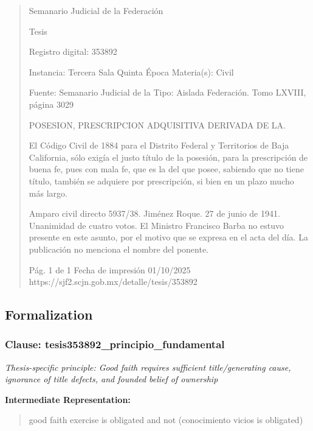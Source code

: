 \documentclass[11pt,a4paper]{article}
\begin{document}
\begin{quote}
                                                   Semanario Judicial de la Federación

                                                  Tesis

 Registro digital: 353892

 Instancia: Tercera Sala          Quinta Época                           Materia(s): Civil

                                  Fuente: Semanario Judicial de la       Tipo: Aislada
                                  Federación.
                                  Tomo LXVIII, página 3029


POSESION, PRESCRIPCION ADQUISITIVA DERIVADA DE LA.


El Código Civil de 1884 para el Distrito Federal y Territorios de Baja California, sólo exigía el justo
título de la posesión, para la prescripción de buena fe, pues con mala fe, que es la del que posee,
sabiendo que no tiene título, también se adquiere por prescripción, si bien en un plazo mucho más
largo.


Amparo civil directo 5937/38. Jiménez Roque. 27 de junio de 1941. Unanimidad de cuatro votos. El
Ministro Francisco Barba no estuvo presente en este asunto, por el motivo que se expresa en el
acta del día. La publicación no menciona el nombre del ponente.




                                             Pág. 1 de 1              Fecha de impresión 01/10/2025
  https://sjf2.scjn.gob.mx/detalle/tesis/353892

\end{quote}

\subsection{Formalization}

\subsubsection{Clause: tesis353892\_principio\_fundamental}

\textit{Thesis-specific principle: Good faith requires sufficient title/generating cause, ignorance of title defects, and founded belief of ownership}

\textbf{Intermediate Representation:}

\begin{quote}
good faith exercise is obligated and not (conocimiento vicios is obligated)
\end{quote}
\end{document}
